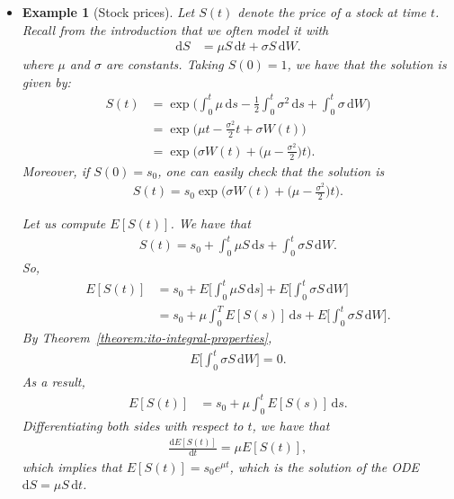 \documentclass[10pt]{article}
\newtheorem{example}[lemma]{Example}
\newcommand{\dee}{\mathrm{d}}
\begin{document}
\begin{itemize}
  \item \begin{example}[Stock prices]
    Let $S(t)$ denote the price of a stock at time $t$. Recall from the introduction that we often model it with
    \begin{align*}
      \dee S &= \mu S\, \dee t + \sigma S\, \dee W.
    \end{align*}
    where $\mu$ and $\sigma$ are constants. Taking $S(0) = 1$, we have that the solution is given by:
    \begin{align*}
      S(t) &= \exp\bigg( \int_0^t \mu\, \dee s - \frac{1}{2} \int_0^t \sigma^2\, \dee s + \int_0^t \sigma\, \dee W \bigg) \\
      &= \exp\bigg(\mu t - \frac{\sigma^2}{2} t + \sigma W(t)\bigg) \\
      &= \exp\bigg( \sigma W(t) + \bigg( \mu - \frac{\sigma^2}{2} \bigg) t \bigg).
    \end{align*}
    Moreover, if $S(0) = s_0$, one can easily check that the solution is
    \begin{align*}
      S(t) = s_0 \exp\bigg( \sigma W(t) + \bigg( \mu - \frac{\sigma^2}{2} \bigg) t \bigg).
    \end{align*}

    Let us compute $E[S(t)]$. We have that
    \begin{align*}
      S(t) = s_0 + \int_0^t \mu S\, \dee s + \int_0^t \sigma S\, \dee W.
    \end{align*}
    So,
    \begin{align*}
      E[S(t)] &= s_0 + E\bigg[ \int_0^t \mu S\, \dee s\bigg] + E\bigg[\int_0^t \sigma S\, \dee W\bigg] \\
      &= s_0 + \mu \int_0^T E[S(s)]\, \dee s + E\bigg[\int_0^t \sigma S\, \dee W\bigg].
    \end{align*}
    By Theorem~\ref{theorem:ito-integral-properties},    
    \begin{align*}
      E\bigg[\int_0^t \sigma S\, \dee W\bigg] = 0.
    \end{align*}
    As a result,
    \begin{align*}
      E[S(t)] &= s_0 + \mu \int_0^t E[ S(s)]\, \dee s.
    \end{align*}
    Differentiating both sides with respect to $t$, we have that
    \begin{align*}
      \frac{\dee E[S(t)]}{\dee t} = \mu E[S(t)],
    \end{align*}
    which implies that $E[S(t)] = s_0 e^{\mu t}$, which is the solution of the ODE $\dee S = \mu S\, \dee t$.
  \end{example}


\end{itemize}
\end{document}
